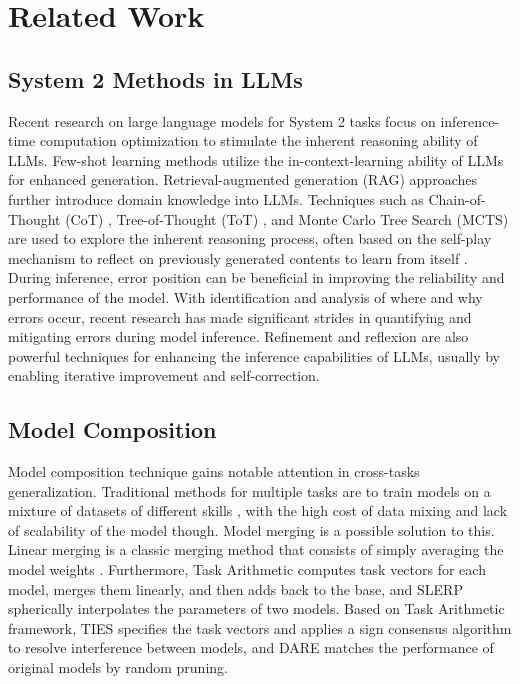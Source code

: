 \section{Related Work}
\subsection{System 2 Methods in LLMs}
Recent research on large language models for System 2 tasks focus on inference-time computation optimization to stimulate the inherent reasoning ability of LLMs. Few-shot learning methods \cite{wang2022code4struct,madaan2022language} utilize the in-context-learning ability of LLMs for enhanced generation. Retrieval-augmented generation (RAG) approaches \cite{nashid2023retrieval,du2024codegragbridginggapnatural} further introduce domain knowledge into LLMs. 
Techniques such as Chain-of-Thought (CoT) \cite{yang2024chain,jiang2024self,li2023structured}, Tree-of-Thought (ToT) \cite{yao2024tree,la2024can}, and Monte Carlo Tree Search (MCTS) \cite{li2024rethinkmcts,zhang2023planning,hu2024uncertainty,hao2023reasoning,feng2024alphazeroliketreesearchguidelarge} are used to explore the inherent reasoning process, often based on the self-play mechanism to reflect on previously generated contents to learn from itself \cite{haluptzok2022language,chen2023gaining,lu2023self,chen2023teaching,madaan2024self,shinn2024reflexion}.
During inference, error position can be beneficial in improving the reliability and performance of the model. With identification and analysis of where and why errors occur, recent research \cite{yao2024mulberry, luo2024improve, wu2025error} has made significant strides in quantifying and mitigating errors during model inference. Refinement \cite{madaan2024self, gou2023critic} and reflexion \cite{shinn2024reflexion, lee2025evolving} are also powerful techniques for enhancing the inference capabilities of LLMs, usually by enabling iterative improvement and self-correction.

\subsection{Model Composition}
Model composition technique gains notable attention in cross-tasks generalization. 
Traditional methods for multiple tasks are to train models on a mixture of datasets of different skills \cite{caruana1997multitask, chen2018gradnorm}, with the high cost of data mixing and lack of scalability of the model though. Model merging is a possible solution to this. Linear merging is a classic merging method that consists of simply averaging the model weights \cite{izmailov2018averaging, smith2017investigation}. Furthermore, Task Arithmetic \cite{ilharco2022editing} computes task vectors for each model, merges them linearly, and then adds back to the base, and SLERP \cite{white2016sampling} spherically interpolates the parameters of two models. Based on Task Arithmetic framework, TIES \cite{yadav2024ties} specifies the task vectors and applies a sign consensus algorithm to resolve interference between models, and DARE \cite{yu2024language} matches the performance of original models by random pruning.

